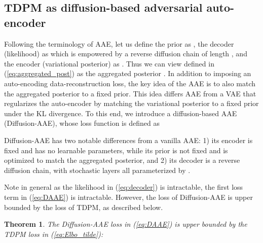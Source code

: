 \documentclass{article} \usepackage{iclr2023_conference,times}
\newcommand{\ba}[1]{}
\newcommand{\given}{\,|\,}
\def\Eqref#1{(\ref{#1})}
\def\rvx{{\mathbf{x}}}
\newcommand{\E}{\mathbb{E}}
\theoremstyle{plain}
\newtheorem{theorem}{Theorem}\newtheorem{proposition}[theorem]{Proposition}
\theoremstyle{definition}
\theoremstyle{remark}
\begin{document}
{\subsection{TDPM as diffusion-based adversarial auto-encoder}
Following the terminology of AAE, let us define the prior as , the decoder (likelihood) as  
\ba{
\textstyle
p_{\theta}(\rvx_{0}\given \rvx_{T_\text{trunc}})  \coloneqq  \int\ldots\int  \big[\prod_{t=1}^{T_\text{trunc}}p_{\theta}(\rvx_{t-1}\given \rvx_{t})\big] d \rvx_{T_\text{trunc}-1}\ldots d \rvx_{1},
\label{eq:decoder}
} which is empowered by a reverse diffusion chain of length , and the encoder (variational posterior) as  . Thus we can view  defined in \Eqref{eq:aggregated_post} as the aggregated posterior \citep{hoffman2016elbo,tomczak2018vae}.
In addition to imposing an auto-encoding data-reconstruction loss, the key idea of 
the AAE \citep{makhzani2015adversarial} is to also match the aggregated posterior to a fixed prior. This idea differs AAE from a VAE that regularizes the auto-encoder by matching the variational posterior to a fixed prior under the KL divergence.
To this end, we introduce a diffusion-based AAE (Diffusion-AAE), whose loss function is defined as
\ba{
\mathcal{L}_{\text{Diffusion-AAE}}=-\E_{q(\rvx_0)}\E_{q(\rvx_{T_\text{trunc}}\given \rvx_0)}\log p_{\theta}(\rvx_0\given \rvx_{T_\text{trunc}}) + \mathcal{D}(q(\rvx_{T_\text{trunc}}))|| p_{\psi}(\rvx_{T_\text{trunc}})). \label{eq:DAAE}
}
Diffusion-AAE has two notable differences from a vanilla AAE: 1) its encoder is fixed and has no learnable parameters, while its prior is not fixed and is optimized to match the aggregated posterior, and 2) its decoder is a reverse diffusion chain,  with  stochastic layers all  parameterized by . 

Note in general as the likelihood in \Eqref{eq:decoder}  is intractable, the first loss term in  \Eqref{eq:DAAE} is intractable. 
However, the loss of Diffusion-AAE is upper bounded by the loss of TDPM, as described below.
\begin{theorem} 
\label{theorem:bound}
The Diffusion-AAE loss in \Eqref{eq:DAAE} is upper bounded by the TDPM loss in \Eqref{eq:Elbo_tilde}:
    
\end{theorem}




















}
\end{document}
